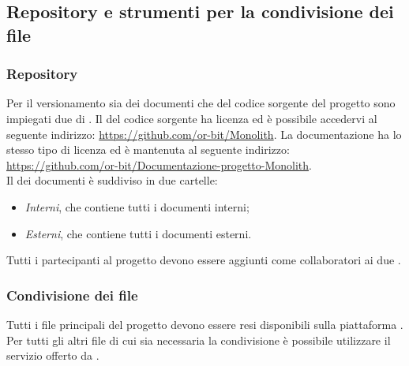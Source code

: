 \subsection{Repository e strumenti per la condivisione dei file}

\subsubsection{Repository}
Per il versionamento sia dei documenti che del codice sorgente del progetto sono impiegati due  di . Il  del codice sorgente ha licenza  ed è possibile accedervi al seguente indirizzo: \url{https://github.com/or-bit/Monolith}.
La documentazione ha lo stesso tipo di licenza ed è mantenuta al seguente indirizzo: \url{https://github.com/or-bit/Documentazione-progetto-Monolith}.\\
Il  dei documenti è suddiviso in due cartelle: 
\begin{itemize}
	\item \textit{Interni}, che contiene tutti i documenti interni;
	\item \textit{Esterni}, che contiene tutti i documenti esterni.
\end{itemize}
Tutti i partecipanti al progetto devono essere aggiunti come collaboratori ai due .

\subsubsection{Condivisione dei file}
Tutti i file principali del progetto devono essere resi disponibili sulla piattaforma . Per tutti gli altri file di cui sia necessaria la condivisione è possibile utilizzare il servizio offerto da .

